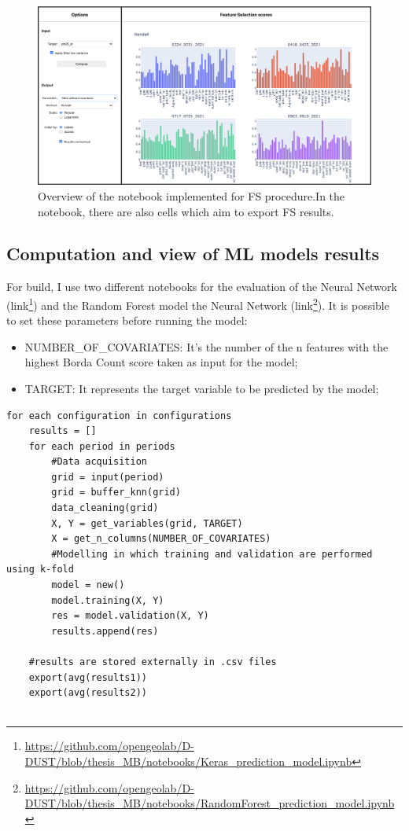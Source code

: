\begin{figure}[H]
    \centering
    \includegraphics[scale=0.40]{images/notebook.png}
    \caption{Overview of the notebook implemented for FS procedure.In the notebook, there are also cells which aim to export FS results.}
    \label{fig:notebook}
\end{figure}
\pagebreak


\subsection{Computation and view of ML models results}
For build, I use two different notebooks for the evaluation of the Neural Network (link\footnote{\url{https://github.com/opengeolab/D-DUST/blob/thesis_MB/notebooks/Keras_prediction_model.ipynb}}) and the Random Forest model
the Neural Network (link\footnote{\url{https://github.com/opengeolab/D-DUST/blob/thesis_MB/notebooks/RandomForest_prediction_model.ipynb}}). 
It is possible to set these parameters before running the model:
\begin{itemize}
    \item NUMBER\_OF\_COVARIATES: It's the number of the n features with the highest Borda Count score taken as input for the model;
    \item TARGET: It represents the target variable to be predicted by the model;
\end{itemize}
\begin{verbatim}
for each configuration in configurations
    results = []
    for each period in periods
        #Data acquisition
        grid = input(period)
        grid = buffer_knn(grid)
        data_cleaning(grid)
        X, Y = get_variables(grid, TARGET)
        X = get_n_columns(NUMBER_OF_COVARIATES)
        #Modelling in which training and validation are performed using k-fold
        model = new()
        model.training(X, Y)
        res = model.validation(X, Y)
        results.append(res)
    
    #results are stored externally in .csv files
    export(avg(results1))
    export(avg(results2))
 
\end{verbatim}

